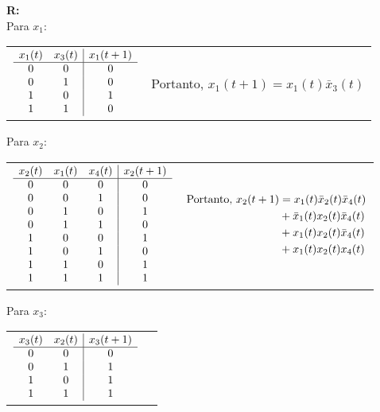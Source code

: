 \documentclass[12pt]{article}
\newcommand{\answer}[1]{{\fontfamily{\rmdefault}\selectfont \textbf{R:} #1}}
\begin{document}
\answer {
\\Para $x_1$:
\vspace{.2cm}
\begin{tabular}{c l}
$\begin{array}{cc | c}
  x_1 (t) &  x_3 (t) & x_1 (t + 1) \\
  \hline
    0     &     0    &     0       \\
    0     &     1    &     0       \\
    1     &     0    &     1       \\
    1     &     1    &     0       
\end{array}$

&

Portanto, $x_1 (t + 1) = x_1 (t) \bar x_3 (t)$ 
\end{tabular}


\vspace{.2cm}
Para $x_2$:
\begin{tabular}{c l}
$\begin{array}{ccc | c}
  x_2 (t) &  x_1 (t) & x_4 (t) & x_2 (t + 1) \\
  \hline 
    0     &     0    &     0   &     0       \\
    0     &     0    &     1   &     0       \\
    0     &     1    &     0   &     1       \\
    0     &     1    &     1   &     0       \\    
    1     &     0    &     0   &     1       \\
    1     &     0    &     1   &     0       \\
    1     &     1    &     0   &     1       \\
    1     &     1    &     1   &     1       \\    
\end{array}$

&

$\begin{aligned}[t]
  \textup{Portanto, } 
      x_2 (t + 1) &= x_1 (t) \bar{x}_2 (t)  \bar{x}_4(t) \\
                  &+ \bar{x}_1 (t) x_2 (t) \bar{x}_4 (t) \\
                  &+ x_1 (t) x_2 (t) \bar{x}_4(t) \\
                  &+ x_1 (t) x_2 (t) x_4(t) 
\end{aligned}$
\end{tabular}

\bigbreak
Para $x_3$:
\vspace{.2cm}
\begin{tabular}{c l}
$\begin{array}{cc | c}
  x_3 (t) &  x_2 (t) & x_3 (t + 1) \\
  \hline
    0     &     0    &     0       \\
    0     &     1    &     1       \\
    1     &     0    &     1       \\
    1     &     1    &     1       
\end{array}$


\end{tabular}}
\end{document}
